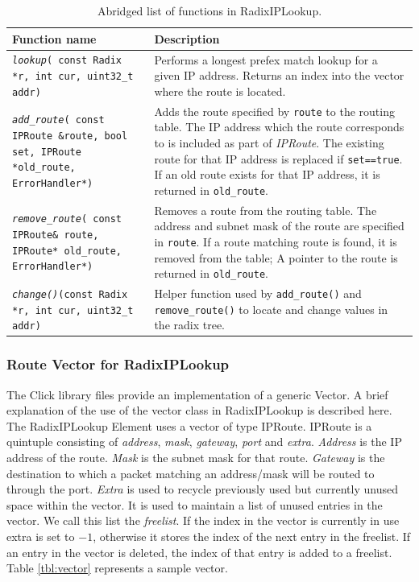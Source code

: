 \documentclass[a4paper]{article}
\begin{document}
\begin{table}[float=tph]

\centering
\begin{tabular}{p{1.2in}p{3in}}
\toprule%
Function name & Description \\
\midrule
\texttt{\textit{lookup}( const Radix *r, int cur, uint32\_t addr)} & 
Performs a longest prefex match lookup for a given IP address. Returns an index into the vector where the route is located. \\ \addlinespace[0.1in]

\texttt{\textit{add\_route}( const IPRoute \&route, bool set, IPRoute *old\_route, ErrorHandler*)} & Adds the route specified by \texttt{route} to
the routing table. The IP address which the route corresponds to is
included as part of \emph{IPRoute}. The existing route for that IP
address is replaced if \texttt{set==true}. If an old route exists for
that IP address, it is returned in \texttt{old\_route}.  \\ \addlinespace[0.1in]

\texttt{\textit{remove\_route}}\texttt{( const IPRoute\& route, IPRoute* old\_route, ErrorHandler*)} & 
Removes a route from the routing table. The address and subnet mask of
the route are specified in \texttt{route}. If a route matching route
is found, it is removed from the table; A pointer to the route is
returned in \texttt{old\_route}. \\ \addlinespace[0.1in]

\texttt{\textit{change()}(const Radix *r, int cur, uint32\_t addr)} & 
Helper function used by \texttt{add\_route()} and \texttt{remove\_route()} to locate and change values in the radix tree.
\\
\bottomrule
\end{tabular}
\caption{Abridged list of functions in RadixIPLookup.}
\label{tbl:functionsinradixiplookup}
\end{table}
\subsubsection{Route Vector for RadixIPLookup}
The Click library files provide an implementation of a generic Vector. A brief explanation of the use of the vector class in RadixIPLookup is described here. The RadixIPLookup Element uses a vector of type IPRoute. IPRoute is a quintuple consisting of \emph{address}, \emph{mask}, \emph{gateway}, \emph{port} and \emph{extra}. \emph{Address} is the IP address of the route. \emph{Mask} is the subnet mask for that route. \emph{Gateway} is the destination to which a packet matching an address/mask will be routed to through the port. \emph{Extra} is used to recycle previously used but currently unused space within the vector. It is used to maintain a list of unused entries in the vector. We call this list the \emph{freelist}. If the index in the vector is currently in use extra is set to $-1$, otherwise it stores the index of the next entry in the freelist. If an entry in the vector is deleted, the index of that entry is added to a freelist. Table \ref{tbl:vector} represents a sample vector.
\end{document}
